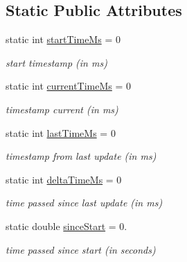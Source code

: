 \subsection*{Static Public Attributes}
\begin{DoxyCompactItemize}
\item 
\mbox{\label{classJuliaTime_ada9446882532931111011695d7ed2e02}} 
static int \hyperlink{classJuliaTime_ada9446882532931111011695d7ed2e02}{start\+Time\+Ms} = 0
\begin{DoxyCompactList}\small\item\em start timestamp (in ms) \end{DoxyCompactList}\item 
\mbox{\label{classJuliaTime_a843524b27f79699732a64dabde8992d5}} 
static int \hyperlink{classJuliaTime_a843524b27f79699732a64dabde8992d5}{current\+Time\+Ms} = 0
\begin{DoxyCompactList}\small\item\em timestamp current (in ms) \end{DoxyCompactList}\item 
\mbox{\label{classJuliaTime_aeda4f6b158bbca7f22acb28020ba9891}} 
static int \hyperlink{classJuliaTime_aeda4f6b158bbca7f22acb28020ba9891}{last\+Time\+Ms} = 0
\begin{DoxyCompactList}\small\item\em timestamp from last update (in ms) \end{DoxyCompactList}\item 
\mbox{\label{classJuliaTime_a3a9b7d1156c8fc6ca35d52cc90f2324a}} 
static int \hyperlink{classJuliaTime_a3a9b7d1156c8fc6ca35d52cc90f2324a}{delta\+Time\+Ms} = 0
\begin{DoxyCompactList}\small\item\em time passed since last update (in ms) \end{DoxyCompactList}\item 
\mbox{\label{classJuliaTime_a55613ba6095a84edae7de90b6c2c16a5}} 
static double \hyperlink{classJuliaTime_a55613ba6095a84edae7de90b6c2c16a5}{since\+Start} = 0.
\begin{DoxyCompactList}\small\item\em time passed since start (in seconds) \end{DoxyCompactList}\item 

\end{DoxyCompactItemize}
